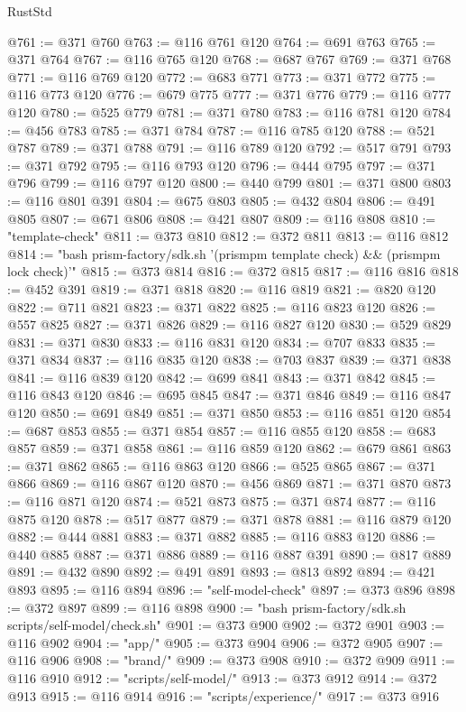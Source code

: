 \begin{lexlean}{RustStd}
\begin{coremodule}
@761 := @371 @760
@763 := @116 @761 @120
@764 := @691 @763
@765 := @371 @764
@767 := @116 @765 @120
@768 := @687 @767
@769 := @371 @768
@771 := @116 @769 @120
@772 := @683 @771
@773 := @371 @772
@775 := @116 @773 @120
@776 := @679 @775
@777 := @371 @776
@779 := @116 @777 @120
@780 := @525 @779
@781 := @371 @780
@783 := @116 @781 @120
@784 := @456 @783
@785 := @371 @784
@787 := @116 @785 @120
@788 := @521 @787
@789 := @371 @788
@791 := @116 @789 @120
@792 := @517 @791
@793 := @371 @792
@795 := @116 @793 @120
@796 := @444 @795
@797 := @371 @796
@799 := @116 @797 @120
@800 := @440 @799
@801 := @371 @800
@803 := @116 @801 @391
@804 := @675 @803
@805 := @432 @804
@806 := @491 @805
@807 := @671 @806
@808 := @421 @807
@809 := @116 @808
@810 := "template-check"
@811 := @373 @810
@812 := @372 @811
@813 := @116 @812
@814 := "bash prism-factory/sdk.sh '(prismpm template check) && (prismpm lock check)'"
@815 := @373 @814
@816 := @372 @815
@817 := @116 @816
@818 := @452 @391
@819 := @371 @818
@820 := @116 @819
@821 := @820 @120
@822 := @711 @821
@823 := @371 @822
@825 := @116 @823 @120
@826 := @557 @825
@827 := @371 @826
@829 := @116 @827 @120
@830 := @529 @829
@831 := @371 @830
@833 := @116 @831 @120
@834 := @707 @833
@835 := @371 @834
@837 := @116 @835 @120
@838 := @703 @837
@839 := @371 @838
@841 := @116 @839 @120
@842 := @699 @841
@843 := @371 @842
@845 := @116 @843 @120
@846 := @695 @845
@847 := @371 @846
@849 := @116 @847 @120
@850 := @691 @849
@851 := @371 @850
@853 := @116 @851 @120
@854 := @687 @853
@855 := @371 @854
@857 := @116 @855 @120
@858 := @683 @857
@859 := @371 @858
@861 := @116 @859 @120
@862 := @679 @861
@863 := @371 @862
@865 := @116 @863 @120
@866 := @525 @865
@867 := @371 @866
@869 := @116 @867 @120
@870 := @456 @869
@871 := @371 @870
@873 := @116 @871 @120
@874 := @521 @873
@875 := @371 @874
@877 := @116 @875 @120
@878 := @517 @877
@879 := @371 @878
@881 := @116 @879 @120
@882 := @444 @881
@883 := @371 @882
@885 := @116 @883 @120
@886 := @440 @885
@887 := @371 @886
@889 := @116 @887 @391
@890 := @817 @889
@891 := @432 @890
@892 := @491 @891
@893 := @813 @892
@894 := @421 @893
@895 := @116 @894
@896 := "self-model-check"
@897 := @373 @896
@898 := @372 @897
@899 := @116 @898
@900 := "bash prism-factory/sdk.sh scripts/self-model/check.sh"
@901 := @373 @900
@902 := @372 @901
@903 := @116 @902
@904 := "app/"
@905 := @373 @904
@906 := @372 @905
@907 := @116 @906
@908 := "brand/"
@909 := @373 @908
@910 := @372 @909
@911 := @116 @910
@912 := "scripts/self-model/"
@913 := @373 @912
@914 := @372 @913
@915 := @116 @914
@916 := "scripts/experience/"
@917 := @373 @916

\end{coremodule}
\end{lexlean}
